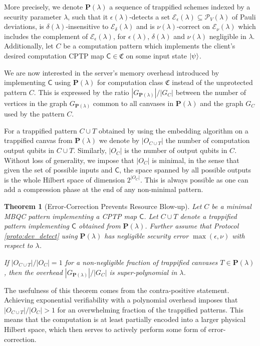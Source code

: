 \documentclass[12pt]{iopart}
\newcommand{\cptp}[1]{\mathsf{#1}} \newcommand{\pd}[1]{\mathcal{#1}}  \newcommand{\sch}[1]{\bm{#1}}
\renewcommand{\1}{\mathds{1}}
\newcommand{\TP}{C\cup T}
\newtheorem{theorem}{Theorem}
\begin{document}
More precisely, we denote $\sch P(\lambda)$ a sequence of trappified schemes indexed by a security parameter $\lambda$, such that it $\epsilon(\lambda)$-detects a set $\mathcal E_\epsilon(\lambda) \subseteq \mathcal P_V(\lambda)$ of Pauli deviations, is $\delta(\lambda)$-insensitive to $\mathcal E_\delta(\lambda)$ and is $\nu(\lambda)$-correct on $\mathcal E_\nu(\lambda)$ which includes the complement of $\mathcal E_\epsilon(\lambda)$, for $\epsilon(\lambda)$, $\delta(\lambda)$ and $\nu(\lambda)$ negligible in $\lambda$.
Additionally, let $C$ be a computation pattern which implements the client's desired computation CPTP map $\cptp C \in \mathfrak{C}$ on some input state $\ket\psi$.

We are now interested in the server's memory overhead introduced by implementing $\cptp C$ using $\sch P(\lambda)$ for computation class $\mathfrak{C}$ instead of the unprotected pattern $C$.
This is expressed by the ratio $|G_{\sch P(\lambda)}|/|G_{C}|$ between the number of vertices in the graph $G_{\sch P(\lambda)}$ common to all canvases in $\sch P(\lambda)$ and the graph $G_{C}$ used by the pattern $C$.

For a trappified pattern $\TP$ obtained by using the embedding algorithm on a trappified canvas from $\sch P(\lambda)$ we denote by $|O_{\TP}|$ the number of computation output qubits in $\TP$.
Similarly, $|O_{C}|$ is the number of output qubits in $C$.
Without loss of generality, we impose that $|O_{C}|$ is minimal, in the sense that given the set of possible inputs and $\cptp C$, the space spanned by all possible outputs is the whole Hilbert space of dimension $2^{|O_{C}|}$.
This is always possible as one can add a compression phase at the end of any non-minimal pattern.

\begin{theorem}[Error-Correction Prevents Resource Blow-up]\label{thm:encoding}
Let $C$ be a minimal MBQC pattern implementing a CPTP map $\cptp C$.
Let $\TP$ denote a trappified pattern implementing $\cptp C$ obtained from $\sch P(\lambda)$.
Further assume that Protocol \ref{proto:dev_detect} using $\sch P(\lambda)$ has negligible security error $\max(\epsilon, \nu)$ with respect to $\lambda$.

If $|O_{\TP}|/|O_{C}| = 1$ for a non-negligible fraction of trappified canvases $T \in \sch P(\lambda)$, then the overhead $|G_{\sch P(\lambda)}|/|G_{C}|$ is super-polynomial in $\lambda$.
\end{theorem}

The usefulness of this theorem comes from the contra-positive statement.
Achieving exponential verifiability with a polynomial overhead imposes that $|O_{\TP}|/|O_{C}| > 1$ for an overwhelming fraction of the trappified patterns.
This means that the computation is at least partially encoded into a larger physical Hilbert space,
which then serves to actively perform some form of error-correction.
\end{document}
